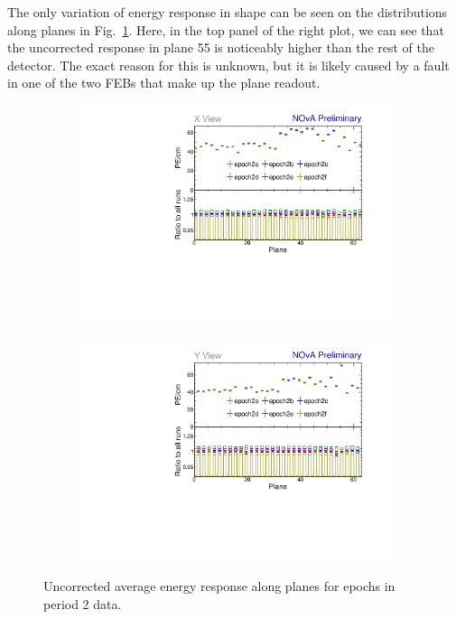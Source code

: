 The only variation of energy response in shape can be seen on the distributions along planes in Fig.~\ref{fig:CalibhistPlanePE_period2}. Here, in the top panel of the right plot, we can see that the uncorrected response in plane 55 is noticeably higher than the rest of the detector. The exact reason for this is unknown, but it is likely caused by a fault in one of the two \gls{FEB}s that make up the plane readout.

\begin{figure}[h]
\centering
\begin{subfigure}[b]{0.495\textwidth}
\centering
\includegraphics[width=\textwidth]{Plots/TBCalibration/Attenprofs_P2Data_PlanePE_X_Combined.pdf}
\end{subfigure}
\begin{subfigure}[b]{0.495\textwidth}
\centering
\includegraphics[width=\textwidth]{Plots/TBCalibration/Attenprofs_P2Data_PlanePE_Y_Combined.pdf}
\end{subfigure}
\caption{Uncorrected average energy response along planes for epochs in period 2 data.}
\label{fig:CalibhistPlanePE_period2}
\end{figure}

